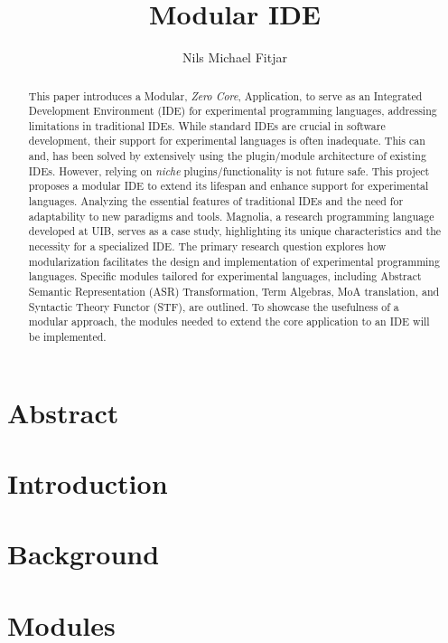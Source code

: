 \documentclass[runningheads]{llncs}
\title{Modular IDE}
\author{Nils Michael Fitjar\inst{1,2}}
\institute{Western Norway University of Applied Sciences\\
\email{798183@stud.hvl.no}
\and
University of Bergen\\
\email{nfi005@uib.no}
}
\begin{document}
\frontmatter

\maketitle

\chapter{Abstract} \label{abstract}

\begin{abstract}
  This paper introduces a Modular, \textit{Zero Core}, Application, to serve as
  an Integrated Development Environment (IDE) for experimental programming
  languages, addressing limitations in traditional IDEs. While standard IDEs are
  crucial in software development, their support for experimental languages is
  often inadequate. This can and, has been solved by extensively using the
  plugin/module architecture of existing IDEs. However, relying on
  \textit{niche} plugins/functionality is not future safe.
  This project proposes a modular IDE to extend its lifespan and enhance support
  for experimental languages. Analyzing the essential features of traditional
  IDEs and the need for adaptability to new paradigms and tools. Magnolia, a
  research programming language developed at UIB, serves as a case study,
  highlighting its unique characteristics and the necessity for a specialized
  IDE. The primary research question explores how modularization facilitates the
  design and implementation of experimental programming languages. Specific
  modules tailored for experimental languages, including Abstract Semantic
  Representation (ASR) Transformation, Term Algebras, MoA translation, and
  Syntactic Theory Functor (STF), are outlined. To showcase the usefulness of
  a modular approach, the modules needed to extend the core application to an
  IDE will be implemented.
\end{abstract}

\tableofcontents

\mainmatter

\chapter{Introduction} \label{ch:intro}


\chapter{Background} \label{ch:background}




\chapter{Modules} \label{ch:module}








\printbibliography
\end{document}
